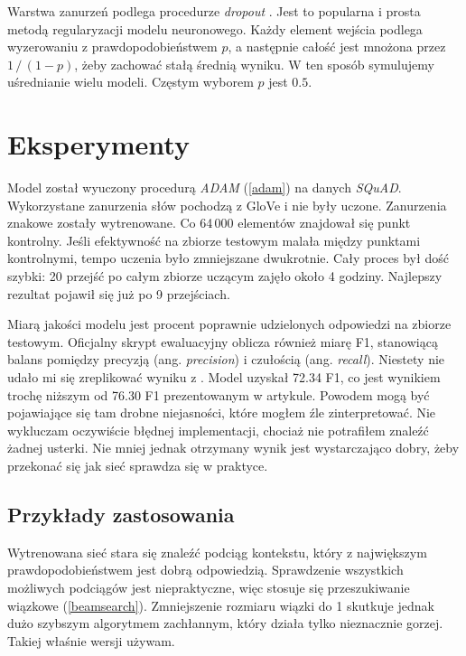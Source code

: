 Warstwa zanurzeń podlega procedurze \textit{dropout} \cite{dropout}. Jest to popularna i prosta metodą regularyzacji modelu neuronowego. Każdy element wejścia podlega wyzerowaniu z prawdopodobieństwem $p$, a następnie całość jest mnożona przez $1\, /\, (1-p)$, żeby zachować stałą średnią wyniku. W ten sposób symulujemy uśrednianie wielu modeli. Częstym wyborem $p$ jest $0.5$.


\section{Eksperymenty}

Model został wyuczony procedurą \textit{ADAM} (\ref{adam}) na danych \textit{SQuAD}. Wykorzystane zanurzenia słów pochodzą z GloVe i nie były uczone. Zanurzenia znakowe zostały wytrenowane. Co 64\,000 elementów znajdował się punkt kontrolny. Jeśli efektywność na zbiorze testowym malała między punktami kontrolnymi, tempo uczenia było zmniejszane dwukrotnie. Cały proces był dość szybki: 20 przejść po całym zbiorze uczącym zajęło około 4 godziny. Najlepszy rezultat pojawił się już po 9 przejściach.

Miarą jakości modelu jest procent poprawnie udzielonych odpowiedzi na zbiorze testowym. Oficjalny skrypt ewaluacyjny oblicza również miarę F1, stanowiącą balans pomiędzy precyzją (ang. \textit{precision}) i czułością (ang. \textit{recall}). Niestety nie udało mi się zreplikować wyniku z \cite{fastqa}. Model uzyskał 72.34 F1, co jest wynikiem trochę niższym od 76.30 F1 prezentowanym w artykule. Powodem mogą być pojawiające się tam drobne niejasności, które mogłem źle zinterpretować. Nie wykluczam oczywiście błędnej implementacji, chociaż nie potrafiłem znaleźć żadnej usterki. Nie mniej jednak otrzymany wynik jest wystarczająco dobry, żeby przekonać się jak sieć sprawdza się w praktyce.


\subsection{Przykłady zastosowania}

Wytrenowana sieć stara się znaleźć podciąg kontekstu, który z największym prawdopodobieństwem jest dobrą odpowiedzią. Sprawdzenie wszystkich możliwych podciągów jest niepraktyczne, więc stosuje się przeszukiwanie wiązkowe (\ref{beamsearch}). Zmniejszenie rozmiaru wiązki do 1 skutkuje jednak dużo szybszym algorytmem zachłannym, który działa tylko nieznacznie gorzej. Takiej właśnie wersji używam.

